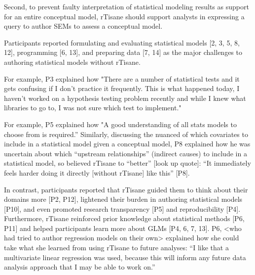 Second, to prevent faulty interpretation of statistical modeling results as
support for an entire conceptual model, rTisane should support analysts in
expressing a query to author SEMs to assess a conceptual model. 


Participants reported formulating and evaluating statistical models [2, 3, 5, 8,
12], programming [6, 13], and preparing data [7, 14] as the major challenges to
authoring statistical models without rTisane. 

For example, P3 explained how "There are a number of statistical tests and it
gets confusing if I don't practice it frequently. This is what happened today, I
haven't worked on a hypothesis testing problem recently and while I knew what
libraries to go to, I was not sure which test to implement."

For example, P5 explained how "A good understanding of all stats models to
choose from is required.” Similarly, discussing the nuanced of which covariates
to include in a statistical model given a conceptual model, P8 explained how he
was uncertain about which “upstream relationships” (indirect causes) to include
in a statistical model, so believed rTisane to “better” [look up quote]: “It
immediately feels harder doing it directly [without rTisane] like this” [P8].

In contrast, participants reported that rTisane guided them to think
about their domains more [P2, P12], lightened their burden in authoring
statistical models [P10], and even promoted research transparency [P5] and
reproducibility [P4]. Furthermore, rTisane reinforced prior knowledge about statistical methods [P6,
P11] and helped participants learn more about GLMs [P4, 6, 7, 13]. P6, <who had
tried to author regression models on their own> explained how she could take
what she learned from using rTisane to future analyses: “I like that a
multivariate linear regression was used, because this will inform any future
data analysis approach that I may be able to work on.”


